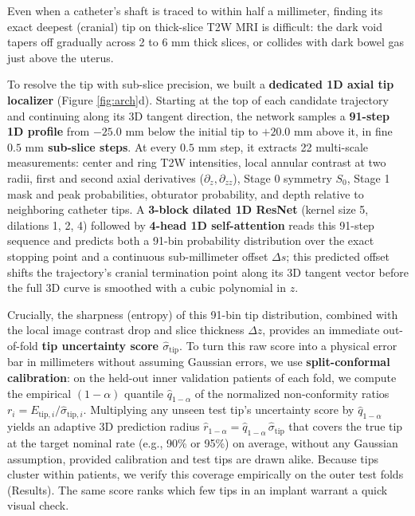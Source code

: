 \documentclass[
  11pt,
]{article}
\begin{document}
Even when a catheter's shaft is traced to within half a millimeter,
finding its exact deepest (cranial) tip on thick-slice T2W MRI is
difficult: the dark void tapers off gradually across 2 to 6 mm thick
slices, or collides with dark bowel gas just above the uterus.

To resolve the tip with sub-slice precision, we built a
\textbf{dedicated 1D axial tip localizer} (Figure \ref{fig:arch}d).
Starting at the top of each candidate trajectory and continuing along
its 3D tangent direction, the network samples a \textbf{91-step 1D
profile} from \(-25.0\text{ mm}\) below the initial tip to
\(+20.0\text{ mm}\) above it, in fine \textbf{\(0.5\text{ mm}\)
sub-slice steps}. At every \(0.5\text{ mm}\) step, it extracts 22
multi-scale measurements: center and ring T2W intensities, local annular
contrast at two radii, first and second axial derivatives
(\(\partial_z, \partial_{zz}\)), Stage 0 symmetry \(S_0\), Stage 1 mask
and peak probabilities, obturator probability, and depth relative to
neighboring catheter tips. A \textbf{3-block dilated 1D ResNet} (kernel
size 5, dilations 1, 2, 4) followed by \textbf{4-head 1D self-attention}
reads this 91-step sequence and predicts both a 91-bin probability
distribution over the exact stopping point and a continuous
sub-millimeter offset \(\Delta s\); this predicted offset shifts the
trajectory's cranial termination point along its 3D tangent vector
before the full 3D curve is smoothed with a cubic polynomial in \(z\).

Crucially, the sharpness (entropy) of this 91-bin tip distribution,
combined with the local image contrast drop and slice thickness
\(\Delta z\), provides an immediate out-of-fold \textbf{tip uncertainty
score \(\hat{\sigma}_{\text{tip}}\)}. To turn this raw score into a
physical error bar in millimeters without assuming Gaussian errors, we
use \textbf{split-conformal calibration}: on the held-out inner
validation patients of each fold, we compute the empirical
\((1-\alpha)\) quantile \(\hat{q}_{1-\alpha}\) of the normalized
non-conformity ratios
\(r_i = E_{\text{tip}, i} / \hat{\sigma}_{\text{tip}, i}\). Multiplying
any unseen test tip's uncertainty score by \(\hat{q}_{1-\alpha}\) yields
an adaptive 3D prediction radius
\(\hat{r}_{1-\alpha} = \hat{q}_{1-\alpha}\,\hat{\sigma}_{\text{tip}}\)
that covers the true tip at the target nominal rate (e.g., 90\% or 95\%)
on average, without any Gaussian assumption, provided calibration and
test tips are drawn alike. Because tips cluster within patients, we
verify this coverage empirically on the outer test folds (Results). The
same score ranks which few tips in an implant warrant a quick visual
check.
\end{document}
